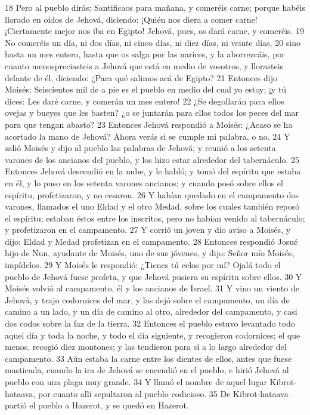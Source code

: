 18 Pero al pueblo dirás: Santificaos para mañana, y comeréis carne; porque habéis llorado en oídos de Jehová, diciendo: ¡Quién nos diera a comer carne! ¡Ciertamente mejor nos iba en Egipto! Jehová, pues, os dará carne, y comeréis.
19 No comeréis un día, ni dos días, ni cinco días, ni diez días, ni veinte días,
20 sino hasta un mes entero, hasta que os salga por las narices, y la aborrezcáis, por cuanto menospreciasteis a Jehová que está en medio de vosotros, y llorasteis delante de él, diciendo: ¿Para qué salimos acá de Egipto?
21 Entonces dijo Moisés: Seiscientos mil de a pie es el pueblo en medio del cual yo estoy; ¡y tú dices: Les daré carne, y comerán un mes entero!
22 ¿Se degollarán para ellos ovejas y bueyes que les basten? ¿o se juntarán para ellos todos los peces del mar para que tengan abasto?
23 Entonces Jehová respondió a Moisés: ¿Acaso se ha acortado la mano de Jehová? Ahora verás si se cumple mi palabra, o no.
24 Y salió Moisés y dijo al pueblo las palabras de Jehová; y reunió a los setenta varones de los ancianos del pueblo, y los hizo estar alrededor del tabernáculo.
25 Entonces Jehová descendió en la nube, y le habló; y tomó del espíritu que estaba en él, y lo puso en los setenta varones ancianos; y cuando posó sobre ellos el espíritu, profetizaron, y no cesaron.
26 Y habían quedado en el campamento dos varones, llamados el uno Eldad y el otro Medad, sobre los cuales también reposó el espíritu; estaban éstos entre los inscritos, pero no habían venido al tabernáculo; y profetizaron en el campamento.
27 Y corrió un joven y dio aviso a Moisés, y dijo: Eldad y Medad profetizan en el campamento.
28 Entonces respondió Josué hijo de Nun, ayudante de Moisés, uno de sus jóvenes, y dijo: Señor mío Moisés, impídelos.
29 Y Moisés le respondió: ¿Tienes tú celos por mí? Ojalá todo el pueblo de Jehová fuese profeta, y que Jehová pusiera su espíritu sobre ellos.
30 Y Moisés volvió al campamento, él y los ancianos de Israel.
31 Y vino un viento de Jehová, y trajo codornices del mar, y las dejó sobre el campamento, un día de camino a un lado, y un día de camino al otro, alrededor del campamento, y casi dos codos   sobre la faz de la tierra. 
32 Entonces el pueblo estuvo levantado todo aquel día y toda la noche, y todo el día siguiente, y recogieron codornices; el que menos, recogió diez montones; y las tendieron para sí a lo largo alrededor del campamento.
33 Aún estaba la carne entre los dientes de ellos, antes que fuese masticada, cuando la ira de Jehová se encendió en el pueblo, e hirió Jehová al pueblo con una plaga muy grande.
34 Y llamó el nombre de aquel lugar Kibrot-hataava, por cuanto allí sepultaron al pueblo codicioso.
35 De Kibrot-hataava partió el pueblo a Hazerot, y se quedó en Hazerot.

